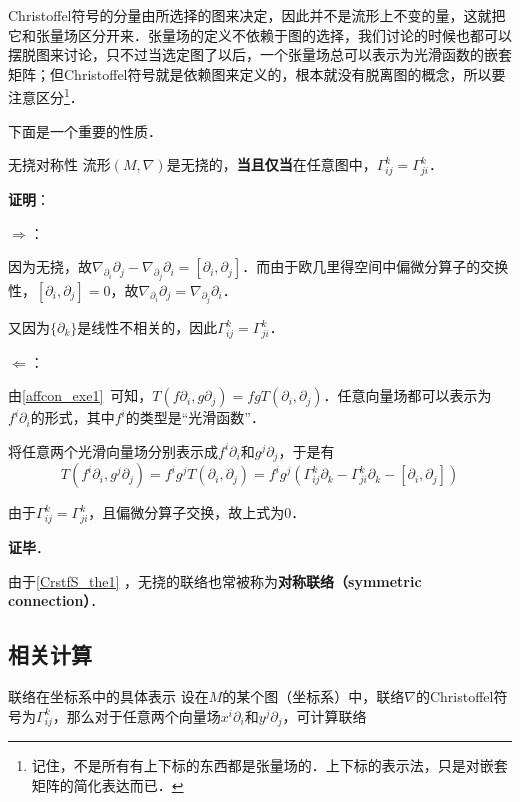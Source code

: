 Christoffel符号的分量由所选择的图来决定，因此并不是流形上不变的量，这就把它和张量场区分开来．张量场的定义不依赖于图的选择，我们讨论的时候也都可以摆脱图来讨论，只不过当选定图了以后，一个张量场总可以表示为光滑函数的嵌套矩阵；但Christoffel符号就是依赖图来定义的，根本就没有脱离图的概念，所以要注意区分\footnote{记住，不是所有有上下标的东西都是张量场的．上下标的表示法，只是对嵌套矩阵的简化表达而已．}．


下面是一个重要的性质．

\begin{theorem}{无挠对称性}\label{CrstfS_the1}
流形$(M, \nabla)$是无挠的，\textbf{当且仅当}在任意图中，$\Gamma^k_{ij}=\Gamma^k_{ji}$．
\end{theorem}

\textbf{证明}：

$\Rightarrow$：

因为无挠，故$\nabla_{\partial_i}\partial_j-\nabla_{\partial_j}\partial_i=[\partial_i, \partial_j]$．而由于欧几里得空间中偏微分算子的交换性，$[\partial_i, \partial_j]=0$，故$\nabla_{\partial_i}\partial_j=\nabla_{\partial_j}\partial_i$．

又因为$\{\partial_k\}$是线性不相关的，因此$\Gamma^k_{ij}=\Gamma^k_{ji}$．

$\Leftarrow$：

由\autoref{affcon_exe1}~可知，$T(f\partial_i, g\partial_j)=fgT(\partial_i, \partial_j)$．任意向量场都可以表示为$f^i\partial_i$的形式，其中$f^i$的类型是“光滑函数”．

将任意两个光滑向量场分别表示成$f^i\partial_i$和$g^j\partial_j$，于是有
\begin{equation}
T(f^i\partial_i, g^j\partial_j)=f^ig^jT(\partial_i, \partial_j)=f^ig^j(\Gamma^k_{ij}\partial_k-\Gamma^k_{ji}\partial_k-[\partial_i, \partial_j])
\end{equation}

由于$\Gamma^k_{ij}=\Gamma^k_{ji}$，且偏微分算子交换，故上式为$0$．

\textbf{证毕}．

由于\autoref{CrstfS_the1} ，无挠的联络也常被称为\textbf{对称联络（symmetric connection）}．


\subsection{相关计算}

\begin{theorem}{联络在坐标系中的具体表示}
设在$M$的某个图（坐标系）中，联络$\nabla$的Christoffel符号为$\Gamma^k_{ij}$，那么对于任意两个向量场$x^i\partial_i$和$y^j\partial_j$，可计算联络
\end{theorem}










